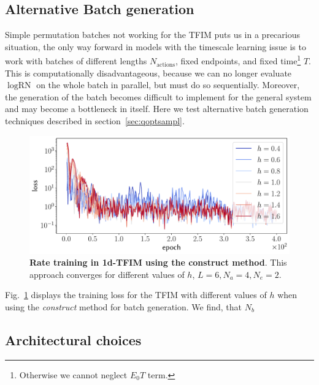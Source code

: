 \subsection{Alternative Batch generation}
Simple permutation batches not working for the TFIM puts us in a precarious situation, the only way forward in models with the timescale learning issue is to work with batches of different lengths $N_{\text{actions}}$, fixed endpoints, and fixed time\footnote{Otherwise we cannot neglect $E_0T$ term.} $T$. This is computationally disadvantageous, because we can no longer evaluate $\log \text{RN}$ on the whole batch in parallel, but must do so sequentially. Moreover, the generation of the batch becomes difficult to implement for the general system and may become a bottleneck in itself. Here we test alternative batch generation techniques described in section~\ref{sec:qoptsampl}. 
\begin{figure}[h]
	\centering
	\includegraphics[width=\linewidth]{Chapter5/Figs/Vector/constr-g-loss}
	\caption[Rate training in 1d-TFIM using the construct method]{\textbf{Rate training in 1d-TFIM using the construct method}. This approach converges for different values of $h$, $L=6, N_a=4, N_e=2$.}
	\label{fig:constr-g-loss}
\end{figure}
Fig.~\ref{fig:constr-g-loss} displays the training loss for the TFIM with different values of $h$ when using the \emph{construct} method for batch generation. We find, that $N_b$

\newpage
\subsection{Architectural choices}

